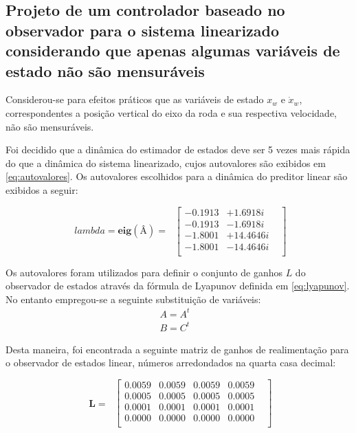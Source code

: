\documentclass[a4paper]{ifacconf}
\begin{document}
\subsection{Projeto de um controlador baseado no observador para o sistema linearizado considerando
que apenas algumas variáveis de estado não são mensuráveis}

Considerou-se para efeitos práticos que as variáveis de estado $x_w$ e $\dot{x}_w$, correspondentes a posição vertical do eixo da roda e sua respectiva velocidade, não são mensuráveis.

Foi decidido que a dinâmica do estimador de estados deve ser 5 vezes  mais rápida do que a dinâmica do sistema linearizado, cujos autovalores são exibidos em \ref{eq:autovalores}.
Os autovalores escolhidos para a dinâmica do preditor linear são exibidos a seguir:

 \begin{equation} \label{eq:autovalores_pred}
        \begin{split}
             lambda=\mathbf{eig(Â)}=\
        \end{split}
        \begin{bmatrix}
            -0.1913& + 1.6918i&\\
            -0.1913& - 1.6918i&\\
            -1.8001& +14.4646i&\\
            -1.8001& -14.4646i&\\
        \end{bmatrix}
    \end{equation}

Os autovalores foram utilizados para definir o conjunto de ganhos $L$ do observador de estados através da fórmula de Lyapunov definida em \ref{eq:lyapunov}. No entanto empregou-se a seguinte substituição de variáveis:
 \begin{equation} \label{eq:var_pred}
        \begin{split}
        A = A^{t}&\\
        B = C^{t}&
        \end{split}
 \end{equation}

Desta maneira, foi encontrada a seguinte matriz de ganhos de realimentação para o observador de estados linear, números arredondados na quarta casa decimal:

 \begin{equation} \label{eq:ganhos_pred}
        \begin{split}
            \mathbf{L}=\
        \end{split}
        \begin{bmatrix}
            0.0059& 0.0059& 0.0059& 0.0059&\\
            0.0005& 0.0005& 0.0005& 0.0005&\\
            0.0001& 0.0001& 0.0001& 0.0001&\\
            0.0000& 0.0000& 0.0000& 0.0000&\\
        \end{bmatrix}
    \end{equation}
\end{document}

